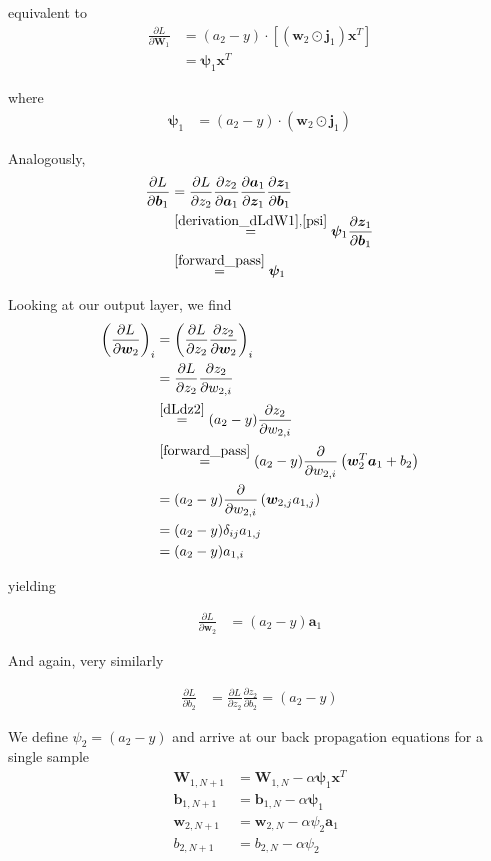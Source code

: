 \documentclass[varwidth,border=2cm]{standalone}
\newcommand{\pd}[2]{\frac{\partial #1}{\partial #2}}
\newcommand{\req}[1]{\overset{\eqref{#1}}{=}}
\newcommand{\rreq}[2]{\overset{\eqref{#1}, \eqref{#2}}{=}}
\begin{document}
equivalent to
\begin{align}\label{dLdW1}
\pd{L}{\bm W_1} &= (a_2 - y) \cdot [(\bm w_2 \odot \bm j_1)\bm x^T] \\
                &= \bm \psi_1 \bm x^T \nonumber
\end{align}

where
\begin{align}
\bm \psi_1 &= (a_2 - y) \cdot (\bm w_2 \odot \bm j_1)
\label{psi}
\end{align}

Analogously,
\begin{align}
\frac{\partial L}{\partial \bm b_1} &= \frac{\partial L}{\partial z_2}\frac{\partial z_2}{\partial \bm a_1}\frac{\partial \bm a_1}{\partial \bm z_1}\frac{\partial \bm z_1}{\partial \bm b_1} \\
 &\rreq{derivation_dLdW1}{psi} \bm \psi_1 \pd{\bm z_1}{\bm b_1} \nonumber \\
 &\req{forward_pass} \bm \psi_1 \nonumber
\end{align}

Looking at our output layer, we find
\begin{align}
\left( \pd{L}{\bm w_2} \right)_i &= \left( \pd{L}{z_2} \pd{z_2}{\bm w_2} \right)_i \\
 &= \pd{L}{z_2} \pd{z_2}{w_{2,i}} \nonumber \\
 & \req{dLdz2} (a_2 - y) \pd{z_2}{w_{2,i}} \nonumber \\
 & \req{forward_pass} (a_2 - y) \pd{}{w_{2,i}} \left( \bm w_2^T \bm a_1 + b_2 \right) \nonumber \\
 &= (a_2 - y) \pd{}{w_{2,i}} \left( \bm w_{2,j} a_{1,j} \right) \nonumber \\
 &= (a_2 - y) \delta_{ij} a_{1,j} \nonumber \\
 &= (a_2 - y) a_{1,i} \nonumber
\end{align}

yielding

\begin{align}\label{dLdw2}
\pd{L}{\bm w_2} &= (a_2 - y) \bm a_1
\end{align}

And again, very similarly

\begin{align}
\pd{L}{b_2} &= \pd{L}{z_2} \pd{z_2}{b_2} = (a_2 - y)
\end{align}

We define $\psi_2 = (a_2 - y)$ and arrive at our back propagation equations for a single sample
\begin{align}
\bm W_{1, N+1} &= \bm W_{1, N} - \alpha \bm \psi_1 \bm x^T  \\
\bm b_{1, N+1} &= \bm b_{1, N} - \alpha \bm \psi_1 \nonumber \\
\bm w_{2, N+1} &= \bm w_{2, N} - \alpha \psi_2 \bm a_1 \nonumber \\
    b_{2, N+1} &=     b_{2, N} - \alpha \psi_2 \nonumber
\end{align}
\end{document}
